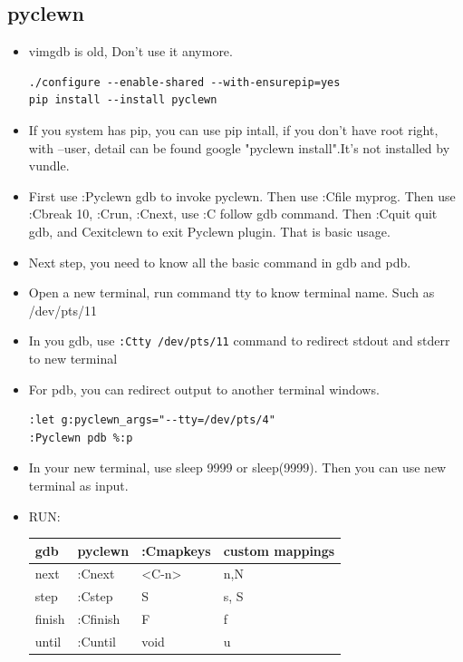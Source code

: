 \documentclass[a4paper,12pt,twoside]{book}
\begin{document}
\subsection{pyclewn}
\begin{itemize}
		\item vimgdb is old, Don't use it anymore.
\begin{verbatim}
./configure --enable-shared --with-ensurepip=yes 
pip install --install pyclewn
\end{verbatim}

		\item If you system has pip, you can use pip intall, if you don't have root right, with --user, detail can be found google "pyclewn install".It's not installed by vundle. 

		\item First use :Pyclewn gdb to invoke pyclewn. Then use :Cfile myprog. Then use :Cbreak 10, :Crun, :Cnext, use :C follow gdb command. Then :Cquit quit gdb, and Cexitclewn to exit Pyclewn plugin. That is basic usage. 

		\item Next step, you need to know all the basic command in gdb and pdb.

		\item Open a new terminal, run command tty to know terminal name. Such as /dev/pts/11

		\item In you gdb, use \verb!:Ctty /dev/pts/11! command to redirect stdout and stderr to new terminal

		\item For pdb, you can redirect output to another terminal windows.   
\begin{verbatim}
:let g:pyclewn_args="--tty=/dev/pts/4"
:Pyclewn pdb %:p
\end{verbatim}

		\item In your new terminal, use sleep 9999 or sleep(9999). Then you can use new terminal as input. 

		\item RUN: \\
\begin{tabular}{p{}|p{}|p{}|p{}}
		\hline 
		gdb & pyclewn & :Cmapkeys & custom mappings \\
		\hline
		next & :Cnext & <C-n> & n,N\\
		\hline 
		step & :Cstep & S& s, S\\
		\hline 
		finish & :Cfinish & F& f\\
		\hline
		until & :Cuntil & void& u\\
		\hline
\end{tabular}


\end{itemize}
\end{document}
